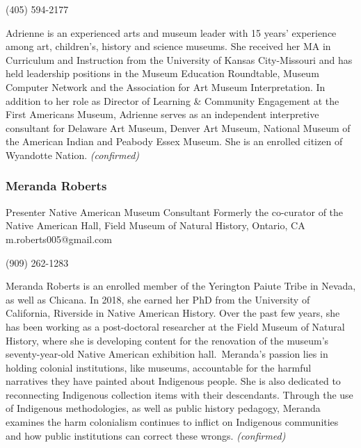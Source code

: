 \documentclass{report}
\begin{document}
                (405) 594-2177\newline

                Adrienne is an experienced arts and museum leader with 15 years’ experience among art, children’s, history and science museums. She received her MA in Curriculum and Instruction from the University of Kansas City-Missouri and has held leadership positions in the Museum Education Roundtable, Museum Computer Network and the Association for Art Museum Interpretation. In addition to her role as Director of Learning \& Community Engagement at the First Americans Museum, Adrienne serves as an independent interpretive consultant for Delaware Art Museum, Denver Art Museum, National Museum of the American Indian and Peabody Essex Museum. She is an enrolled citizen of Wyandotte Nation.
                \emph{ (confirmed) }
              

              
                \subsubsection*{ Meranda Roberts }
                Presenter\newline
                Native American Museum Consultant\newline
                Formerly the co-curator of the Native American Hall, Field Museum of Natural History, Ontario, CA
                \newline
                m.roberts005@gmail.com\newline
                
                (909) 262-1283\newline

                Meranda Roberts is an enrolled member of the Yerington Paiute Tribe in Nevada, as well as Chicana. In 2018, she earned her PhD from the University of California, Riverside in Native American History. Over the past few years, she has been working as a post-doctoral researcher at the Field Museum of Natural History, where she is developing content for the renovation of the museum’s seventy-year-old Native American exhibition hall. Meranda’s passion lies in holding colonial institutions, like museums, accountable for the harmful narratives they have painted about Indigenous people. She is also dedicated to reconnecting Indigenous collection items with their descendants. Through the use of Indigenous methodologies, as well as public history pedagogy, Meranda examines the harm colonialism continues to inflict on Indigenous communities and how public institutions can correct these wrongs.
                \emph{ (confirmed) }
              
\end{document}
